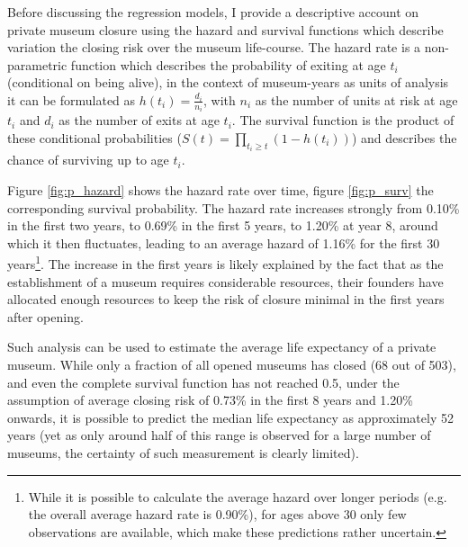 \documentclass[12pt]{article}
\begin{document}
Before discussing the regression models, I provide a descriptive account on private museum closure using the hazard and survival functions which describe variation the closing risk over the museum life-course.
The hazard rate is a non-parametric function which describes the probability of exiting at age \(t_i\) (conditional on being alive), in the context of museum-years as units of analysis it can be formulated as \(h(t_i) = \frac{d_i}{n_i}\), with \(n_i\) as the number of units at risk at age \(t_i\) and \(d_i\) as the number of exits at age \(t_i\).
The survival function is the product of these conditional probabilities (\(S(t) = \prod_{t_i \geq t} \left(1-h(t_i) \right)\)) and describes the chance of surviving up to age \(t_i\). 


Figure \ref{fig:p_hazard} shows the hazard rate over time, figure \ref{fig:p_surv} the corresponding survival probability.
The hazard rate increases strongly from 0.10\% in the first two years, to 0.69\% in the first 5 years, to 1.20\% at year 8, around which it then fluctuates, leading to an average hazard of 1.16\% for the first 30 years\footnote{While it is possible to calculate the average hazard over longer periods (e.g. the overall average hazard rate is 0.90\%), for ages above 30 only few observations are available, which make these predictions rather uncertain.}.
The increase in the first years is likely explained by the fact that as the establishment of a museum requires considerable resources, their founders have allocated enough resources to keep the risk of closure minimal in the first years after opening.

Such analysis can be used to estimate the average life expectancy of a private museum.
While only a fraction of all opened museums has closed (68 out of 503), and even the complete survival function has not reached 0.5, under the assumption of average closing risk of 0.73\% in the first 8 years and 1.20\% onwards, it is possible to predict the median life expectancy as approximately 52 years (yet as only around half of this range is observed for a large number of museums, the certainty of such measurement is clearly limited).
\end{document}
